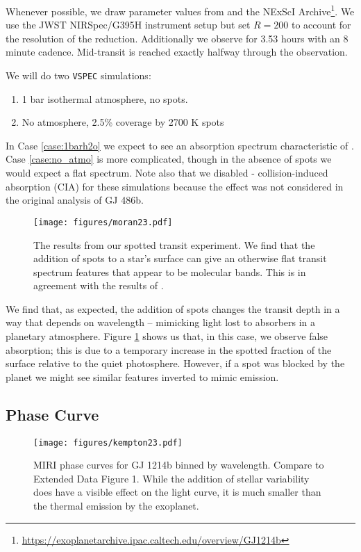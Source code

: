 \documentclass[twocolumn,linenumbers]{aastex631}
\newcommand{\vspec}[1]{\texttt{VSPEC}#1}
\begin{document}
Whenever possible, we draw parameter values from \citet{moran2023} and the NExScI Archive\footnote{\url{https://exoplanetarchive.ipac.caltech.edu/overview/GJ1214b}}.
We use the JWST NIRSpec/G395H instrument setup but set $R=200$ to account for the resolution of the reduction.
Additionally we observe for 3.53 hours with an 8 minute cadence. Mid-transit is reached exactly halfway through the observation.

We will do two \vspec{} simulations:
\begin{enumerate}
    \item 1 bar  isothermal atmosphere, no spots. \label{case:1barh2o}
    \item No atmosphere, 2.5\% coverage by 2700 K spots \label{case:no_atmo}
\end{enumerate}
In Case \ref{case:1barh2o} we expect to see an absorption spectrum characteristic of . Case \ref{case:no_atmo} is more complicated, though in the absence of spots we would expect a flat spectrum. Note also that we disabled - collision-induced absorption (CIA) for
these simulations because the effect was not considered in the original analysis of GJ 486b.

\begin{figure}
    \centering
    \texttt{[image: figures/moran23.pdf]}
    \caption{
        The results from our spotted transit experiment. We find that the addition of
        spots to a star's surface can give an otherwise flat transit spectrum features that appear to be molecular bands.
        This is in agreement with the results of \citet{moran2023}.
        }
    \label{fig:moran_transit}
\end{figure}

We find that, as expected, the addition of spots changes the transit depth in a way that depends on wavelength -- mimicking
light lost to absorbers in a planetary atmosphere. Figure \ref{fig:moran_transit} shows us that, in this case, we observe false absorption;
this is due to a temporary increase in the spotted fraction of the surface relative to the quiet photosphere. However, if a spot was blocked by
the planet we might see similar features inverted to mimic emission.

\subsection{Phase Curve}
\begin{figure}[t]
    \centering
    \texttt{[image: figures/kempton23.pdf]}
    \caption{
        MIRI phase curves for GJ 1214b binned by wavelength. Compare to \citet{kempton2023} Extended Data Figure 1.
        While the addition of stellar variability does have a visible effect on the light curve, it is much smaller than the thermal emission by the exoplanet.
        }
    \label{fig:gj1214b}
\end{figure}
\end{document}
